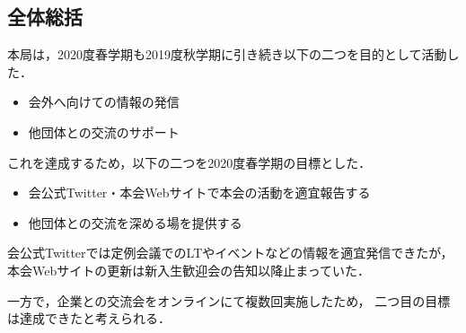 \subsection*{全体総括}


本局は，2020度春学期も2019度秋学期に引き続き以下の二つを目的として活動した．
\begin{itemize}
    \item 会外へ向けての情報の発信
    \item 他団体との交流のサポート
\end{itemize}
これを達成するため，以下の二つを2020度春学期の目標とした．
\begin{itemize}
    \item 会公式Twitter・本会Webサイトで本会の活動を適宜報告する
    \item 他団体との交流を深める場を提供する
\end{itemize}

会公式Twitterでは定例会議でのLTやイベントなどの情報を適宜発信できたが，
本会Webサイトの更新は新入生歓迎会の告知以降止まっていた．

一方で，企業との交流会をオンラインにて複数回実施したため，
二つ目の目標は達成できたと考えられる．
